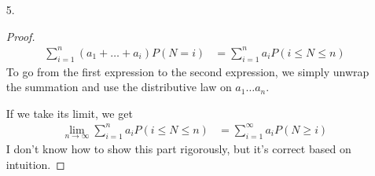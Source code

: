 \documentclass{article}
\begin{document}
\begin{itemize}
\item [5.]
  \begin{proof}
    \begin{equation*}
      \begin{split}
        \sum_{i=1}^n(a_1+\ldots+a_i)P(N=i) &= \sum_{i=1}^na_iP(i \leq
        N \leq n)
      \end{split}
    \end{equation*}
    To go from the first expression to the second expression, we
    simply unwrap the summation and use the distributive law on
    $a_1\ldots a_n$.

    If we take its limit, we get
    \begin{equation*}
      \begin{split}
        \lim_{n\rightarrow \infty}\sum_{i=1}^na_iP(i\leq N \leq n) &=
        \sum_{i=1}^{\infty}a_iP(N \geq i)
      \end{split}
    \end{equation*}
    I don't know how to show this part rigorously, but it's correct
    based on intuition.
  \end{proof}


\end{itemize}
\end{document}
